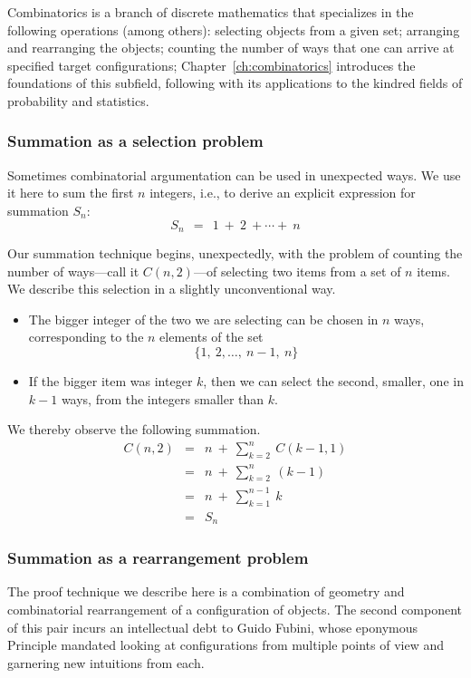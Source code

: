 Combinatorics is a branch of discrete mathematics that specializes in
the following operations (among others): selecting objects from a
given set; arranging and rearranging the objects; counting the number
of ways that one can arrive at specified target configurations;
Chapter~\ref{ch:combinatorics} introduces the foundations of this
subfield, following with its applications to the kindred fields of
probability and statistics.

\subsubsection{Summation as a selection problem}
\label{sec:comb-sum-of-first-n}

Sometimes combinatorial argumentation can be used in unexpected ways.
We use it here to sum the first $n$ integers, i.e., to derive an
explicit expression for summation $S_n$:
\[ S_n \ \ = \ \ 1 \ + \ 2 \ + \cdots + \ n \]

Our summation technique begins, unexpectedly, with the problem of
counting the number of ways---call it $C(n,2)$---of selecting two
items from a set of $n$ items.  We describe this selection in a
slightly unconventional way.
\begin{itemize}
\item
The bigger integer of the two we are selecting can be chosen in $n$
ways, corresponding to the $n$ elements of the set
\[ \{ 1, \ 2, \ldots, \ n-1, \ n \} \]
\item
If the bigger item was integer $k$, then we can select the second,
smaller, one in $k-1$ ways, from the integers smaller than $k$.
\end{itemize}
We thereby observe the following summation.
\begin{eqnarray*}
C(n,2) & = & n \ + \ \sum_{k=2}^n \ C(k-1,1) \\
       & = & n \ + \ \sum_{k=2}^n \ (k-1) \\
       & = & n \ + \ \sum_{k=1}^{n-1} \ k \\
       & = & S_n
\end{eqnarray*}

\subsubsection{Summation as a rearrangement problem}
\label{sec:summation-via-Fubini}

The proof technique we describe here is a combination of geometry and
combinatorial rearrangement of a configuration of objects.  The second
component of this pair incurs an intellectual debt to Guido Fubini,
 whose eponymous Principle 
mandated looking at configurations from multiple points of view and
garnering new intuitions from each.

